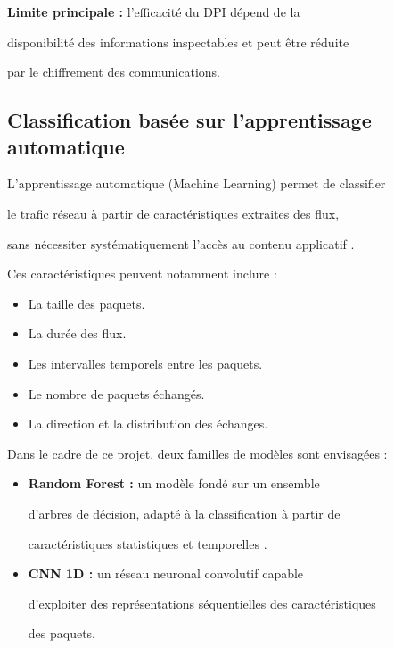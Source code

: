 \textbf{Limite principale :} l'efficacité du DPI dépend de la

disponibilité des informations inspectables et peut être réduite

par le chiffrement des communications.



\subsection{Classification basée sur l'apprentissage automatique}



L'apprentissage automatique (Machine Learning) permet de classifier

le trafic réseau à partir de caractéristiques extraites des flux,

sans nécessiter systématiquement l'accès au contenu applicatif \cite{rezei2019}.



Ces caractéristiques peuvent notamment inclure :



\begin{itemize}

    \item La taille des paquets.

    \item La durée des flux.

    \item Les intervalles temporels entre les paquets.

    \item Le nombre de paquets échangés.

    \item La direction et la distribution des échanges.

\end{itemize}



Dans le cadre de ce projet, deux familles de modèles sont envisagées :



\begin{itemize}

    \item \textbf{Random Forest :} un modèle fondé sur un ensemble

    d'arbres de décision, adapté à la classification à partir de

    caractéristiques statistiques et temporelles \cite{breiman2001}.

    \item \textbf{CNN 1D :} un réseau neuronal convolutif capable

    d'exploiter des représentations séquentielles des caractéristiques

    des paquets.

\end{itemize}



